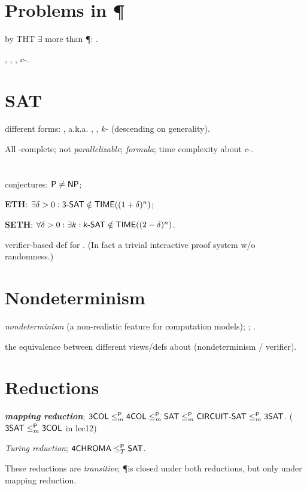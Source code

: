 \documentclass{article}
\begin{document}
\section{Problems in \P}

by THT $\exists$ more than \P: \EXP.
\par
{}, , , $c$-.


\section{SAT}

different forms: ,  a.k.a. , , $k$- (descending on generality).
\par
All \NP-complete;  not \textit{parallelizable}; \textit{formula}; time complexity about $c$-.


\section{\NP}

conjectures: $\text{\sf P} \neq \text{\sf NP}$;
\par
\textbf{ETH}: $\exists \delta > 0: \text{\sf 3-SAT} \notin \text{\sf TIME}((1+\delta)^n)$;
\par
\textbf{SETH}: $\forall \delta>0: \exists k: \text{\sf k-SAT} \notin \text{\sf TIME}((2-\delta)^n)$.
\par
verifier-based def for \NP. (In fact a trivial interactive proof system w/o randomness.)


\section{Nondeterminism}

\textit{nondeterminism} (a non-realistic feature for computation models);
\NTIME;
\NP.
\par
the equivalence between different views/defs about \NP (nondeterminism / verifier).


\section{Reductions}

\textit{\textbf{mapping reduction}};
$\text{\sf 3COL} \leq_m^\text{\sf P} \text{\sf 4COL} \leq_m^\text{\sf P} \text{\sf SAT} \leq_m^\text{\sf P} \text{\sf CIRCUIT-SAT} \leq_m^\text{\sf P} \text{\sf 3SAT}$. ($\text{\sf 3SAT} \leq_m^\text{\sf P} \text{\sf 3COL}$ in lec12)
\par
\textit{Turing reduction};
$\text{\sf 4CHROMA} \leq_T^\text{\sf P} \text{\sf SAT}$.
\par
These reductions are \textit{transitive}; \P is closed under both reductions, but \NP only under mapping reduction.
\end{document}
